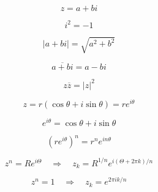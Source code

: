 \[
\boxed{
    z=a+bi
}
\]

\[
\boxed{
    i^2=-1
}
\]

\[
\boxed{
    |a+bi|=\sqrt{a^2+b^2}
}
\]

\[
\boxed{
    \overline{a+bi}=a-bi
}
\]

\[
\boxed{
    z\overline z=|z|^2
}
\]

\[
\boxed{
    z=r(\cos\theta+i\sin\theta)=re^{i\theta}
}
\]

\[
\boxed{
    e^{i\theta}=\cos\theta+i\sin\theta
}
\]

\[
\boxed{
    (re^{i\theta})^n=r^n e^{in\theta}
}
\]

\[
\boxed{
    z^n=Re^{i\Theta}
    \quad\Longrightarrow\quad
    z_k=R^{1/n}e^{i(\Theta+2\pi k)/n}
}
\]

\[
\boxed{
    z^n=1
    \quad\Longrightarrow\quad
    z_k=e^{2\pi i k/n}
}
\]